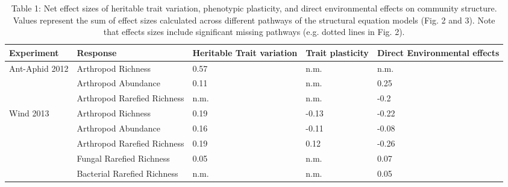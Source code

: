 \begin{table}[]
\centering
\caption{Table 1: Net effect sizes of heritable trait variation, phenotypic plasticity, and direct environmental effects on community structure. Values represent the sum of effect sizes calculated across different pathways of the structural equation models (Fig. 2 and 3). Note that effects sizes include significant missing pathways (e.g. dotted lines in Fig. 2).}
\label{m}
\begin{tabular}{@{}lllll@{}}
\toprule
Experiment                      & Response                    & Heritable Trait variation & Trait plasticity & Direct Environmental effects \\ \midrule
\multirow{3}{*}{Ant-Aphid 2012} & Arthropod Richness          & 0.57                      & n.m.             & n.m.                         \\
                                & Arthropod Abundance         & 0.11                      & n.m.             & 0.25                         \\
                                & Arthropod Rarefied Richness & n.m.                      & n.m.             & -0.2                         \\
\multirow{5}{*}{Wind 2013}      & Arthropod Richness          & 0.19                      & -0.13            & -0.22                        \\
                                & Arthropod Abundance         & 0.16                      & -0.11            & -0.08                        \\
                                & Arthropod Rarefied Richness & 0.19                      & 0.12             & -0.26                        \\
                                & Fungal Rarefied Richness    & 0.05                      & n.m.             & 0.07                         \\
                                & Bacterial Rarefied Richness & n.m.                      & n.m.             & 0.05                         \\ \cmidrule(l){2-5} 
\end{tabular}
\end{table}